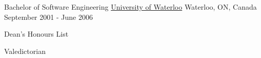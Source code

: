 
\vspace{-0.3cm}
\begin{cventries}

  \cventry
    {Bachelor of Software Engineering} %
    {\href{https://uwaterloo.ca/}{University of Waterloo}} %
    {Waterloo, ON, Canada} %
    {September 2001 - June 2006} %
    {
      \begin{cvitems} %
        \item {Dean's Honours List}
        \item {Valedictorian}
      \end{cvitems}
    }

\end{cventries}
